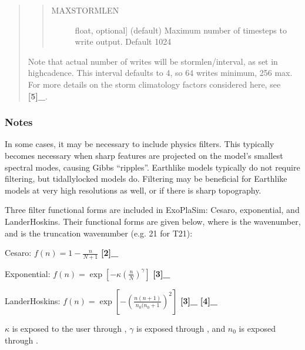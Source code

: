 \documentclass[letterpaper,10pt,english]{sphinxmanual}
\begin{document}
\begin{fulllineitems}
\begin{fulllineitems}
\begin{quote}
\begin{quote}
\begin{description}
\begin{description}
\begin{description}
\item[{MAXSTORMLEN}] \leavevmode{[}float, optional{]}
(default) Maximum number of timesteps to write output. Default 1024

\end{description}

\end{description}

\end{description}
\end{quote}

Note that actual number of writes will be stormlen/interval, as set in highcadence. This interval defaults to 4, so 64 writes minimum, 256 max. For more details on the storm climatology factors considered here, see {\color{red}\bfseries{}{[}5{]}\_}.
\end{quote}
\subsubsection*{Notes}

In some cases, it may be necessary to include physics filters. This typically becomes
necessary when sharp features are projected on the model’s smallest spectral modes, causing
Gibbs “ripples”. Earth\sphinxhyphen{}like models typically do not require filtering, but tidally\sphinxhyphen{}locked
models do. Filtering may be beneficial for Earth\sphinxhyphen{}like models at very high resolutions as well,
or if there is sharp topography.

Three filter functional forms are included in ExoPlaSim: Cesaro, exponential, and Lander\sphinxhyphen{}Hoskins. Their functional forms are given below, where  is the wavenumber, and  is the
truncation wavenumber (e.g. 21 for T21):

Cesaro: \(f(n)=1-\frac{n}{N+1}\) {\color{red}\bfseries{}{[}2{]}\_}

Exponential: \(f(n)=\exp\left[-\kappa\left(\frac{n}{N}\right)^\gamma\right]\) {\color{red}\bfseries{}{[}3{]}\_}

Lander\sphinxhyphen{}Hoskins: \(f(n)=\exp\left[-\left(\frac{n(n+1)}{n_0(n_0+1}\right)^2\right]\) {\color{red}\bfseries{}{[}3{]}\_} {\color{red}\bfseries{}{[}4{]}\_}

\(\kappa\) is exposed to the user through ,
\(\gamma\) is exposed through , and \(n_0\) is
exposed through .


\end{fulllineitems}
\end{fulllineitems}
\end{document}
